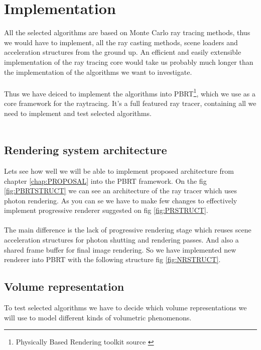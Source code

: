 \chapter{Implementation}
All the selected algorithms are based on Monte Carlo ray tracing methods, thus we would have to implement, all the ray casting methods, scene loaders and acceleration structures from the ground up. An efficient and easily extensible implementation of the ray tracing core would take us probably much longer than the implementation of the algorithms we want to investigate.
\\
\\
Thus we have deiced to implement the algorithms into PBRT\footnote{Physically Based Rendering toolkit source \cite{PBRT}}, which we use as a core framework for the raytracing. It's a full featured ray tracer, containing all we need to implement and test selected algorithms.
\\
\\
\section{Rendering system architecture}
Lets see how well we will be able to implement proposed architecture from chapter \ref{chap:PROPOSAL} into the PBRT framework. On the fig \ref{fig:PBRTSTRUCT} we can see an architecture of the ray tracer which uses photon rendering. As you can se we have to make few changes to effectively implement progressive renderer suggested on fig \ref{fig:PRSTRUCT}.
\\
\\
The main difference is the lack of progressive rendering stage which reuses scene acceleration structures for photon shutting and rendering passes. And also a shared frame buffer for final image rendering. So we have implemented new renderer into PBRT with the following structure fig \ref{fig:NRSTRUCT}.



\section{Volume representation}
To test selected algorithms we have to decide which volume representations we will use to model different kinds of volumetric phenomenons.

